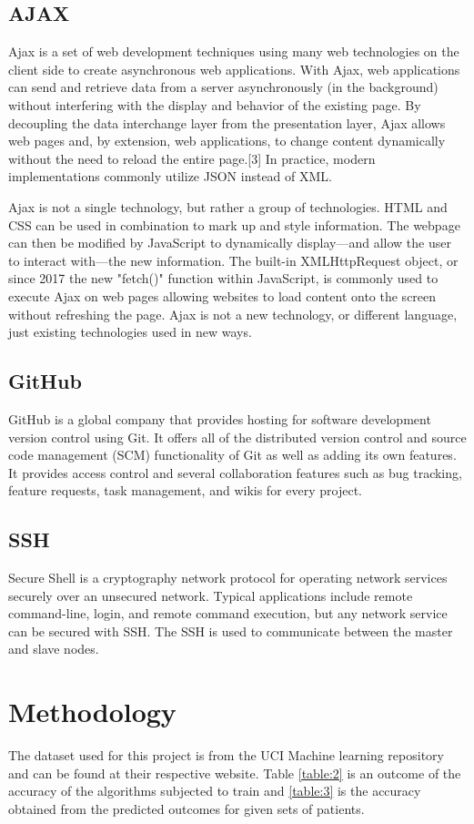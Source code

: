 \documentclass[12pt]{article}
\begin{document}
\subsection{AJAX}
Ajax is a set of web development techniques using many web technologies on the client side to create asynchronous web applications. With Ajax, web applications can send and retrieve data from a server asynchronously (in the background) without interfering with the display and behavior of the existing page. By decoupling the data interchange layer from the presentation layer, Ajax allows web pages and, by extension, web applications, to change content dynamically without the need to reload the entire page.[3] In practice, modern implementations commonly utilize JSON instead of XML.

Ajax is not a single technology, but rather a group of technologies. HTML and CSS can be used in combination to mark up and style information. The webpage can then be modified by JavaScript to dynamically display—and allow the user to interact with—the new information. The built-in XMLHttpRequest object, or since 2017 the new "fetch()" function within JavaScript, is commonly used to execute Ajax on web pages allowing websites to load content onto the screen without refreshing the page. Ajax is not a new technology, or different language, just existing technologies used in new ways.

\subsection{GitHub}
GitHub is a global company that provides hosting for software development version control using Git. It offers all of the distributed version control and source code management (SCM) functionality of Git as well as adding its own features. It provides access control and several collaboration features such as bug tracking, feature requests, task management, and wikis for every project.

\subsection{SSH}
Secure Shell is a cryptography network protocol for operating network services securely over an unsecured network. Typical applications include remote command-line, login, and remote command execution, but any network service can be secured with SSH. The SSH is used to communicate between the master and slave nodes.

\newpage
\section{Methodology}
The dataset used for this project is from the UCI Machine learning repository and can be found at their respective website. Table \ref{table:2} is an outcome of the accuracy of the algorithms subjected to train and \ref{table:3} is the accuracy obtained from the predicted outcomes for given sets of patients. 
\end{document}
